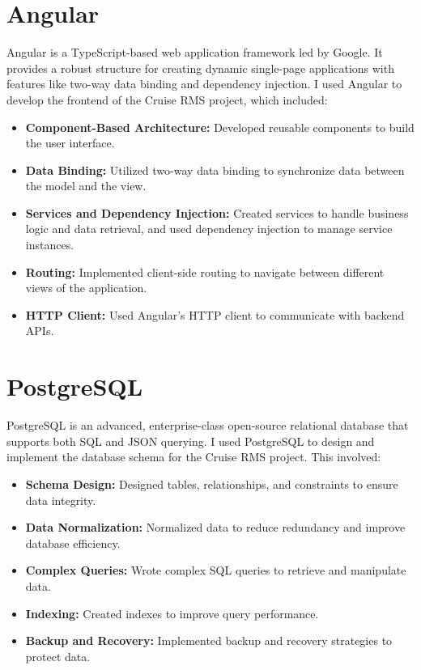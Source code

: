 \documentclass[openany, 11pt]{report} %
\begin{document}
\section{Angular}
Angular is a TypeScript-based web application framework led by Google. It provides a robust structure for creating dynamic single-page applications with features like two-way data binding and dependency injection. I used Angular to develop the frontend of the Cruise RMS project, which included:
\begin{itemize}
    \item \textbf{Component-Based Architecture:} Developed reusable components to build the user interface.
    \item \textbf{Data Binding:} Utilized two-way data binding to synchronize data between the model and the view.
    \item \textbf{Services and Dependency Injection:} Created services to handle business logic and data retrieval, and used dependency injection to manage service instances.
    \item \textbf{Routing:} Implemented client-side routing to navigate between different views of the application.
    \item \textbf{HTTP Client:} Used Angular's HTTP client to communicate with backend APIs.
\end{itemize}

\section{PostgreSQL}
PostgreSQL is an advanced, enterprise-class open-source relational database that supports both SQL and JSON querying. I used PostgreSQL to design and implement the database schema for the Cruise RMS project. This involved:
\begin{itemize}
    \item \textbf{Schema Design:} Designed tables, relationships, and constraints to ensure data integrity.
    \item \textbf{Data Normalization:} Normalized data to reduce redundancy and improve database efficiency.
    \item \textbf{Complex Queries:} Wrote complex SQL queries to retrieve and manipulate data.
    \item \textbf{Indexing:} Created indexes to improve query performance.
    \item \textbf{Backup and Recovery:} Implemented backup and recovery strategies to protect data.
\end{itemize}
\end{document}
